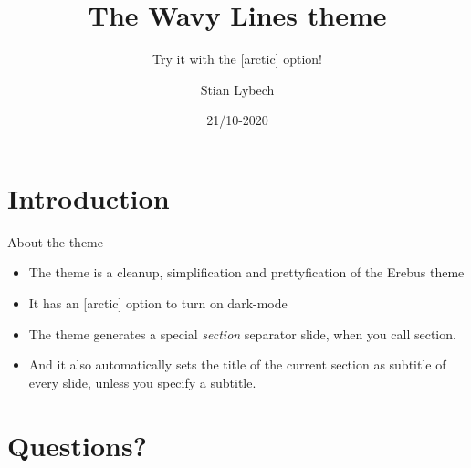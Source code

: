 \documentclass[12pt,aspectratio=169]{beamer}
\title[The Wavy Lines Theme]{\LARGE The Wavy Lines theme}
\subtitle{Try it with the [arctic] option!}
\author[Me!]{Stian Lybech}
\institute[AAU]{Aalborg University}
\date{21/10-2020}
\begin{document}
\maketitle

\section{Introduction}
\begin{frame}{About the theme}
\begin{itemize}
  \item The theme is a cleanup, simplification and prettyfication of the Erebus theme
  \item It has an [arctic] option to turn on dark-mode
  \item The theme generates a special \emph{section} separator slide, when you call section.
  \item And it also automatically sets the title of the current section as subtitle of every slide, unless you specify a subtitle.
\end{itemize}
\end{frame}

\section{Questions?}
\end{document}
